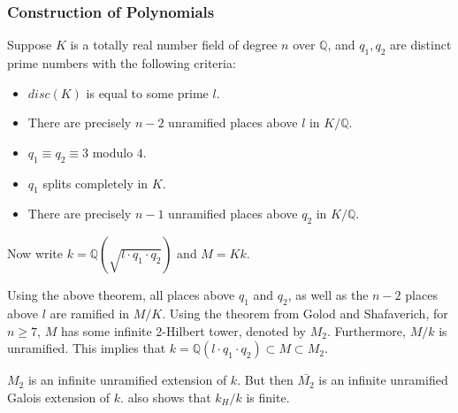 \documentclass[12pt]{extarticle}
\newcommand{\Q}{\mathbb{Q}}
\newcommand{\<}{\langle}
\renewcommand{\>}{\rangle}
\theoremstyle{definition}
\begin{document}
\subsubsection*{Construction of Polynomials}
Suppose $K$ is a totally real number field of degree $n$ over $\Q$, and $q_1,q_2$ are distinct prime numbers with the following criteria:
\begin{itemize}
\item $disc(K)$ is equal to some prime $l$.
\item There are precisely $n-2$ unramified places above $l$ in $K/\Q$. 
\item $q_1 \equiv q_2 \equiv 3 $ modulo $4$.
\item $q_1$ splits completely in $K$.
\item There are precisely $n-1$ unramified places above $q_2$ in $K/\Q$. 
\end{itemize}\par

Now write $k=\Q(\sqrt{l \cdot q_1 \cdot q_2})$ and $M=Kk$. 

Using the above theorem, all places above $q_1$ and $q_2$, as well as the $n-2$ places above $l$ are ramified in $M/K$. Using the theorem from Golod and Shafaverich, for $n \geq 7$, $M$ has some infinite 2-Hilbert tower, denoted by $M_2$. Furthermore, $M/k$ is unramified. This implies that 
$k = \Q(l \cdot q_1 \cdot q_2) \subset M \subset M_2$.\par
$M_2$ is an infinite unramified extension of $k$. But then $\bar{M_2}$ is an infinite unramified Galois extension of $k$.
\cite{MAIR} also shows that $k_H/k$ is finite.  
\end{document}
